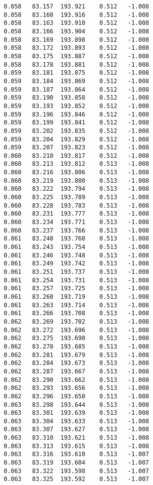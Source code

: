 \begin{verbatim}
   0.058   83.157  193.921    0.512   -1.008
   0.058   83.160  193.916    0.512   -1.008
   0.058   83.163  193.910    0.512   -1.008
   0.058   83.166  193.904    0.512   -1.008
   0.058   83.169  193.898    0.512   -1.008
   0.058   83.172  193.893    0.512   -1.008
   0.058   83.175  193.887    0.512   -1.008
   0.058   83.178  193.881    0.512   -1.008
   0.059   83.181  193.875    0.512   -1.008
   0.059   83.184  193.869    0.512   -1.008
   0.059   83.187  193.864    0.512   -1.008
   0.059   83.190  193.858    0.512   -1.008
   0.059   83.193  193.852    0.512   -1.008
   0.059   83.196  193.846    0.512   -1.008
   0.059   83.199  193.841    0.512   -1.008
   0.059   83.202  193.835    0.512   -1.008
   0.059   83.204  193.829    0.512   -1.008
   0.059   83.207  193.823    0.512   -1.008
   0.060   83.210  193.817    0.512   -1.008
   0.060   83.213  193.812    0.513   -1.008
   0.060   83.216  193.806    0.513   -1.008
   0.060   83.219  193.800    0.513   -1.008
   0.060   83.222  193.794    0.513   -1.008
   0.060   83.225  193.789    0.513   -1.008
   0.060   83.228  193.783    0.513   -1.008
   0.060   83.231  193.777    0.513   -1.008
   0.060   83.234  193.771    0.513   -1.008
   0.060   83.237  193.766    0.513   -1.008
   0.061   83.240  193.760    0.513   -1.008
   0.061   83.243  193.754    0.513   -1.008
   0.061   83.246  193.748    0.513   -1.008
   0.061   83.249  193.742    0.513   -1.008
   0.061   83.251  193.737    0.513   -1.008
   0.061   83.254  193.731    0.513   -1.008
   0.061   83.257  193.725    0.513   -1.008
   0.061   83.260  193.719    0.513   -1.008
   0.061   83.263  193.714    0.513   -1.008
   0.061   83.266  193.708    0.513   -1.008
   0.062   83.269  193.702    0.513   -1.008
   0.062   83.272  193.696    0.513   -1.008
   0.062   83.275  193.690    0.513   -1.008
   0.062   83.278  193.685    0.513   -1.008
   0.062   83.281  193.679    0.513   -1.008
   0.062   83.284  193.673    0.513   -1.008
   0.062   83.287  193.667    0.513   -1.008
   0.062   83.290  193.662    0.513   -1.008
   0.062   83.293  193.656    0.513   -1.008
   0.062   83.296  193.650    0.513   -1.008
   0.063   83.298  193.644    0.513   -1.008
   0.063   83.301  193.639    0.513   -1.008
   0.063   83.304  193.633    0.513   -1.008
   0.063   83.307  193.627    0.513   -1.008
   0.063   83.310  193.621    0.513   -1.008
   0.063   83.313  193.615    0.513   -1.008
   0.063   83.316  193.610    0.513   -1.007
   0.063   83.319  193.604    0.513   -1.007
   0.063   83.322  193.598    0.513   -1.007
   0.063   83.325  193.592    0.513   -1.007

\end{verbatim}
